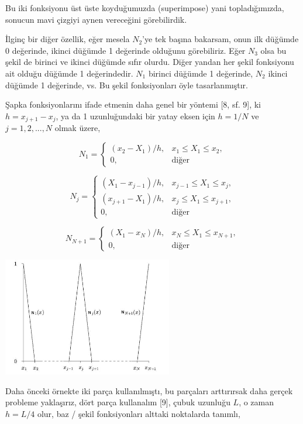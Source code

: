 \documentclass[12pt,fleqn]{article}\usepackage{../../common}
\begin{document}
Bu iki fonksiyonu üst üste koyduğumuzda (superimpose) yani topladığımızda,
sonucun mavi çizgiyi aynen vereceğini görebilirdik.

İlginç bir diğer özellik, eğer mesela $N_2$'ye tek başına bakarsam, onun ilk
düğümde 0 değerinde, ikinci düğümde 1 değerinde olduğunu görebiliriz.  Eğer
$N_3$ olsa bu şekil de birinci ve ikinci düğümde sıfır olurdu. Diğer yandan her
şekil fonksiyonu ait olduğu düğümde 1 değerindedir. $N_1$ birinci düğümde 1
değerinde, $N_2$ ikinci düğümde 1 değerinde, vs. Bu şekil fonksiyonları öyle
tasarlanmıştır.

Şapka fonksiyonlarını ifade etmenin daha genel bir yöntemi [8, sf. 9], ki $h =
x_{j+1}-x_j$, ya da 1 uzunluğundaki bir yatay eksen için $h = 1/N$ ve $j =
1,2,...,N$ olmak üzere,

$$
N_1 = \left\{ \begin{array}{rr}
(x_2 - X_1)/h, & x_1 \le X_1 \le x_2,\\
0, & \textrm{diğer}
\end{array} \right.
$$

$$
N_j = \left\{ \begin{array}{rr}
(X_1 - x_{j-1})/h, & x_{j-1} \le X_1 \le x_j,\\
(x_{j+1} - X_1)/h, & x_j \le X_1 \le x_{j+1},\\
0, & \textrm{diğer}
\end{array} \right.
$$

$$
N_{N+1} = \left\{ \begin{array}{rr}
(X_1 - x_N)/h, & x_N \le X_1 \le x_{N+1},\\
0, & \textrm{diğer}
\end{array} \right.
$$

\includegraphics[width=20em]{compscieng_bpp45fem2_09.jpg}

Daha önceki örnekte iki parça kullanılmıştı, bu parçaları arttırırsak daha
gerçek probleme yaklaşırız, dört parça kullanalım [9], çubuk uzunluğu $L$,
o zaman $h = L/4$ olur, baz / şekil fonksiyonları alttaki noktalarda tanımlı,
\end{document}
